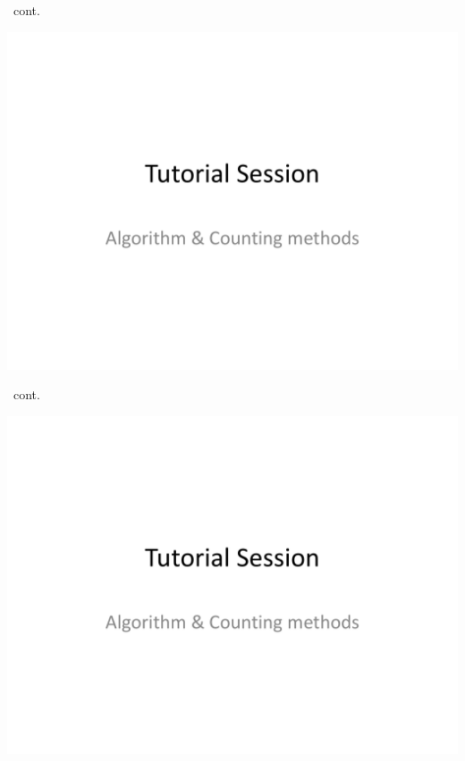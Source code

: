 \documentclass{beamer}
\begin{document}
    \begin{frame}[c,shrink]{\secname\ cont.}
        \centerline{\includegraphics[height=0.85\textheight,page=4]{algo_counting}}
    \end{frame}
    \begin{frame}[c,shrink]{\secname\ cont.}
        \centerline{\includegraphics[height=0.85\textheight,page=5]{algo_counting}}
    \end{frame}
\end{document}
